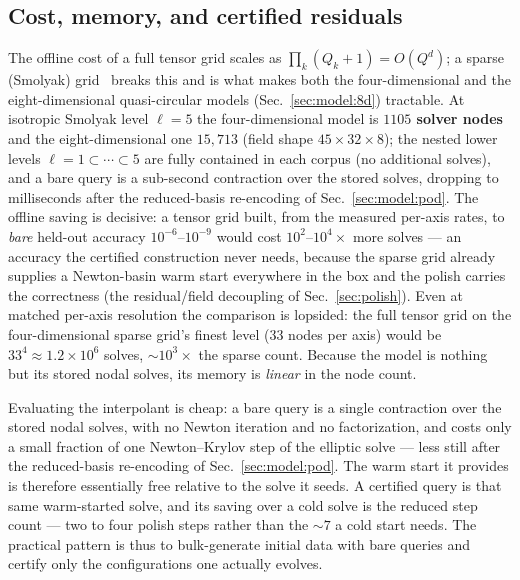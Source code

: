 \documentclass[
  aps,
  prd,
  twocolumn,
  amsmath,
  amssymb,
  nofootinbib,
  superscriptaddress,
  floatfix,
]{revtex4-2}
\begin{document}
\subsection{Cost, memory, and certified residuals}
\label{sec:model:joint}

The offline cost of a full tensor grid scales as $\prod_k(Q_k{+}1)=O(Q^d)$; a
sparse (Smolyak) grid~\cite{Smolyak1963,NobileTemponeWebster2008} breaks this and is
what makes both the four-dimensional and the eight-dimensional quasi-circular
models (Sec.~\ref{sec:model:8d}) tractable. At isotropic Smolyak level $\ell=5$ the
four-dimensional model is \textbf{$1105$ solver nodes} and the eight-dimensional
one \textbf{$15{,}713$} (field shape $45\times32\times8$); the nested lower levels
$\ell=1\subset\cdots\subset5$ are fully contained in each corpus (no additional
solves), and a bare query is a sub-second contraction over the stored solves,
dropping to milliseconds after the reduced-basis re-encoding of
Sec.~\ref{sec:model:pod}. The offline saving is decisive: a tensor grid built,
from the measured per-axis
rates, to \emph{bare} held-out accuracy $10^{-6}$--$10^{-9}$ would cost
$10^{2}$--$10^{4}\times$ more solves --- an accuracy the certified construction
never needs, because the sparse grid already supplies a Newton-basin warm start
everywhere in the box and the polish carries the correctness (the residual/field
decoupling of Sec.~\ref{sec:polish}). Even at matched per-axis resolution the
comparison is lopsided: the full tensor grid on the four-dimensional sparse grid's
finest level ($33$ nodes per axis) would be $33^4\approx1.2\times10^6$ solves,
$\sim\!10^3\times$ the sparse count. Because the model is nothing but its stored
nodal solves, its memory is \emph{linear} in the node count.

Evaluating the interpolant is cheap: a bare query is a single contraction over
the stored nodal solves, with no Newton iteration and no factorization, and costs
only a small fraction of one Newton--Krylov step of the elliptic solve --- less
still after the reduced-basis re-encoding of Sec.~\ref{sec:model:pod}. The warm
start it provides is therefore essentially free relative to the solve it seeds. A
certified query is that same warm-started solve, and its saving over a cold solve
is the reduced step count --- two to four polish steps rather than the $\sim\!7$
a cold start needs. The practical pattern is thus to bulk-generate initial data
with bare queries and certify only the configurations one actually evolves.
\end{document}
